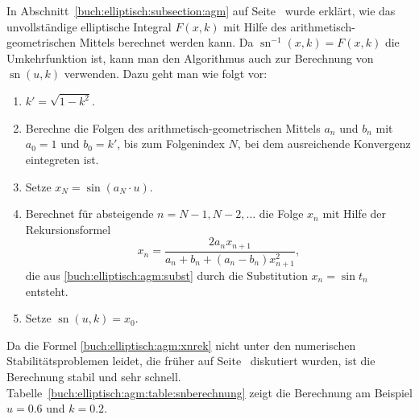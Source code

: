 In Abschnitt~\ref{buch:elliptisch:subsection:agm} auf
Seite~\pageref{buch:elliptisch:subsubection:berechnung-fxk-agm}
wurde erklärt, wie das unvollständige elliptische Integral $F(x,k)$ mit 
Hilfe des arithmetisch-geometrischen Mittels berechnet werden kann.
%
%
Da $\operatorname{sn}^{-1}(x,k) = F(x,k)$ die Umkehrfunktion ist, kann
man den Algorithmus auch zur Berechnung von $\operatorname{sn}(u,k)$ 
verwenden.
Dazu geht man wie folgt vor:
\begin{enumerate}
\item
$k'=\sqrt{1-k^2}$.
\item
Berechne die Folgen des arithmetisch-geometrischen Mittels
$a_n$ und $b_n$ mit $a_0=1$ und $b_0=k'$, bis zum Folgenindex $N$,
bei dem ausreichende Konvergenz eintegreten ist.
\item
Setze $x_N = \sin(a_N \cdot u)$.
\item
Berechnet für absteigende $n=N-1,N-2,\dots$ die Folge $x_n$ mit Hilfe
der Rekursionsformel
\begin{equation}
x_{n}
=
\frac{2a_nx_{n+1}}{a_n+b_n+(a_n-b_n)x_{n+1}^2},
\label{buch:elliptisch:agm:xnrek}
\end{equation}
die aus \eqref{buch:elliptisch:agm:subst}
durch die Substitution $x_n = \sin t_n$ entsteht.
\item
Setze $\operatorname{sn}(u,k) = x_0$.
\end{enumerate}
Da die Formel \eqref{buch:elliptisch:agm:xnrek} nicht unter den
numerischen Stabilitätsproblemen leidet, die früher auf
Seite~\pageref{buch:elliptisch:agm:ellintegral-stabilitaet}
diskutiert wurden, ist die Berechnung stabil und sehr schnell.
Tabelle~\ref{buch:elliptisch:agm:table:snberechnung}
zeigt die Berechnung am Beispiel $u=0.6$ und $k=0.2$.

%
%
